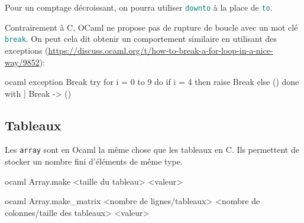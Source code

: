 \documentclass{scrartcl}
\begin{document}
			\rem Pour un comptage décroissant, on pourra utiliser \textcolor{teal}{\texttt{downto}} à la place de \textcolor{teal}{\texttt{to}}.

			\rem Contrairement à C, OCaml ne propose pas de rupture de boucle avec un mot clé \textcolor{teal}{\texttt{break}}. 
			On peut cela dit obtenir un comportement similaire en utilisant des exceptions (\url{https://discuss.ocaml.org/t/how-to-break-a-for-loop-in-a-nice-way/9852}):
			\begin{code}{ocaml}
				exception Break
				try
					for i = 0 to 9 do
						if i = 4 then raise Break
						else ()
					done
				with
				| Break -> ()
			\end{code}

		\subsection{Tableaux}
			Les \texttt{array} sont en Ocaml la même chose que les tableaux en C. Ils permettent de stocker un nombre fini d'éléments de même type.

			\begin{code}{ocaml}
				Array.make <taille du tableau> <valeur>
			\end{code}

			\begin{code}{ocaml}
				Array.make_matrix <nombre de lignes/tableaux> <nombre de colonnes/taille des tableaux> <valeur>
			\end{code}
\end{document}
